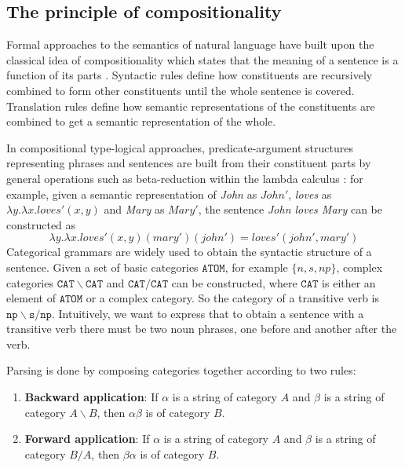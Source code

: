 \subsection{The principle of compositionality}
\label{sec:formal-semantics}

Formal approaches to the semantics of natural language have built upon the classical idea of compositionality which states that the meaning of a sentence is a function of its parts \cite{Janssen2001}. Syntactic rules define how constituents are recursively combined to form other constituents until the whole sentence is covered. Translation rules define how semantic representations of the constituents are combined to get a semantic representation of the whole.

In compositional type-logical approaches, predicate-argument structures representing phrases and sentences are built from their constituent parts by general operations such as beta-reduction within the lambda calculus \cite{THEO:THEO373}: for example, given a semantic representation of \emph{John}
as $\mathit{John}'$, \emph{loves} as $\lambda y.\lambda x.\mathit{loves}'(x, y)$ and \emph{Mary} as $\mathit{Mary'}$, the sentence \emph{John loves Mary} can be constructed as
%
\begin{equation*}
\lambda y.\lambda
x.\mathit{loves}'(x, y)(\mathit{mary}')(\mathit{john}') =
\mathit{loves}'(\mathit{john}', \mathit{mary}')
\end{equation*}
%
Categorical grammars are widely used to obtain the syntactic structure of a sentence. Given a set of basic categories $\texttt{ATOM}$, for example $\{\mathit{n}, \mathit{s}, \mathit{np}\}$, complex categories $\mathtt{CAT} \backslash \mathtt{CAT}$ and $\mathtt{CAT}/\mathtt{CAT}$ can be constructed, where $\mathtt{CAT}$ is either an element of $\texttt{ATOM}$ or a complex category. So the category of a transitive verb is $\mathtt{np}\backslash\mathtt{s}/\mathtt{np}$. Intuitively, we want to express that to obtain a sentence with a transitive verb there must be two noun phrases, one before and another after the verb.

Parsing is done by composing categories together according to two rules:
%
\begin{enumerate}
\item \textbf{Backward application}: If $\alpha$ is a string of category $A$ and
  $\beta$ is a string of category $A\backslash{}B$, then $\alpha\beta$ is of
  category $B$.
\item \textbf{Forward application}: If $\alpha$ is a string of category $A$ and
  $\beta$ is a string of category $B/A$, then $\beta\alpha$ is of category $B$.
\end{enumerate}

